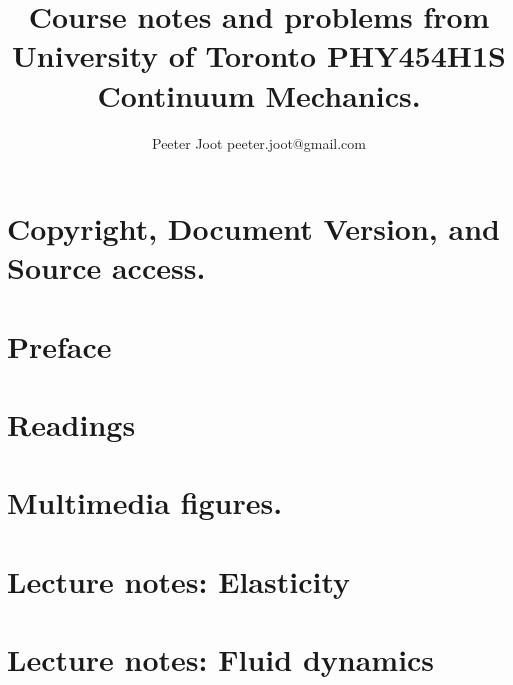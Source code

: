 \documentclass[12pt,leqno]{book}
\begin{document}

\title{Course notes and problems from\\University of Toronto PHY454H1S\\Continuum Mechanics.}
\author{Peeter Joot \quad peeter.joot@gmail.com}

\maketitle

\clearpage{}
\tableofcontents

\clearpage{}

\pagestyle{plain}

\part{Copyright, Document Version, and Source access.}




\part{Preface}


\part{Readings}


\part{Multimedia figures.}


\part{Lecture notes: Elasticity}








\part{Lecture notes: Fluid dynamics}















\end{document}
